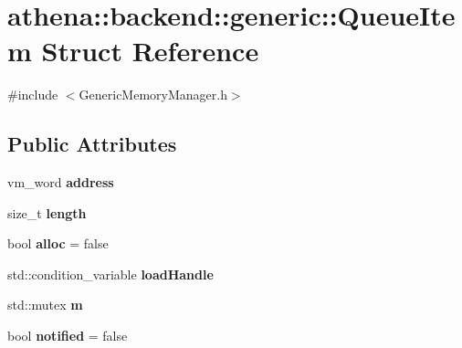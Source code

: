 \hypertarget{structathena_1_1backend_1_1generic_1_1_queue_item}{}\section{athena\+:\+:backend\+:\+:generic\+:\+:Queue\+Item Struct Reference}
\label{structathena_1_1backend_1_1generic_1_1_queue_item}


{\ttfamily \#include $<$Generic\+Memory\+Manager.\+h$>$}

\subsection*{Public Attributes}
\begin{DoxyCompactItemize}
\item 
\mbox{\label{structathena_1_1backend_1_1generic_1_1_queue_item_a9d1c0aa22d58d18392c2ae7bec943b07}} 
vm\+\_\+word {\bfseries address}
\item 
\mbox{\label{structathena_1_1backend_1_1generic_1_1_queue_item_a824170e499e70a8d2bd5c069579671a9}} 
size\+\_\+t {\bfseries length}
\item 
\mbox{\label{structathena_1_1backend_1_1generic_1_1_queue_item_aef5166382f4be9c116bc46e66556384a}} 
bool {\bfseries alloc} = false
\item 
\mbox{\label{structathena_1_1backend_1_1generic_1_1_queue_item_a563299ec884b7fea39492d0b8ba5d6d1}} 
std\+::condition\+\_\+variable {\bfseries load\+Handle}
\item 
\mbox{\label{structathena_1_1backend_1_1generic_1_1_queue_item_a5267156baa60e81c64521b81d803aa50}} 
std\+::mutex {\bfseries m}
\item 
\mbox{\label{structathena_1_1backend_1_1generic_1_1_queue_item_a3d4b8f15dfd8f58ac592988f00879e34}} 
bool {\bfseries notified} = false
\end{DoxyCompactItemize}


